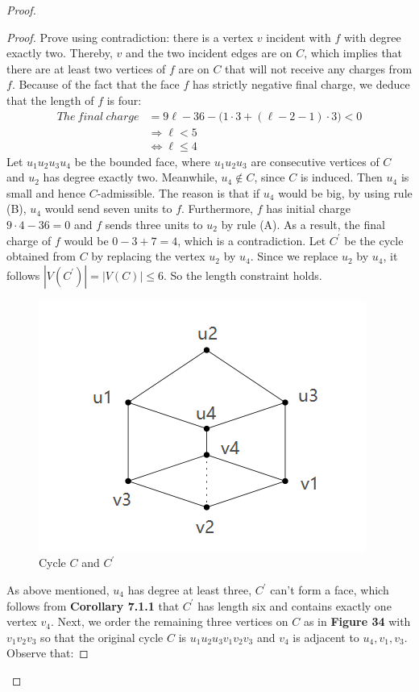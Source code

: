 \begin{proof}
\begin{proof}
Prove using contradiction: there is a vertex $v$ incident with $f$ with degree exactly two. Thereby, $v$ and the two incident edges are on $C$, which implies that there are at least two vertices of $f$ are on $C$ that will not receive any charges from $f$. Because of the fact that the face $f$ has strictly negative final charge, we deduce that the length of $f$ is four:
\begin{align*}
    The \ final \ charge &= 9\ell -36 - \big(1 \cdot 3 + (\ell - 2 - 1) \cdot 3\big) < 0\\
    &\Longrightarrow \ell < 5\\
    &\Longleftrightarrow \ell \leq 4 
\end{align*}
Let $u_1u_2u_3u_4$ be the bounded face, where $u_1u_2u_3$ are consecutive vertices of $C$ and $u_2$ has degree exactly two. Meanwhile, $u_4 \notin C$, since $C$ is induced. Then $u_4$ is small and hence $C$-admissible. The reason is that if $u_4$ would be big, by using rule (B), $u_4$ would send seven units to $f$. Furthermore, $f$ has initial charge $9\cdot4 - 36 = 0$ and $f$ sends three units to $u_2$ by rule (A). As a result, the final charge of $f$ would be $0 - 3 + 7 = 4$, which is a contradiction. Let $C^{'}$ be the cycle obtained from $C$ by replacing the vertex $u_2$ by $u_4$. Since we replace $u_2$ by $u_4$, it follows $|V(C^{'})| = |V(C)| \leq 6$. So the length constraint holds.
\begin{figure}[H] %
    \centering %
    \includegraphics[width=0.4 \textwidth]{figure/corollary3.png} 
    \caption{Cycle $C$ and $C^{'}$} %
    \label{figure} %
\end{figure}
As above mentioned, $u_4$ has degree at least three, $C^{'}$ can't form a face, which follows from \textbf{Corollary 7.1.1} that $C^{'}$ has length six and contains exactly one vertex $v_4$. Next, we order the remaining three vertices on $C$ as in \textbf{Figure 34} with $v_1v_2v_3$ so that the original cycle $C$ is $u_1u_2u_3v_1v_2v_3$ and $v_4$ is adjacent to $u_4, v_1, v_3$. Observe that:

\end{proof}
\end{proof}
